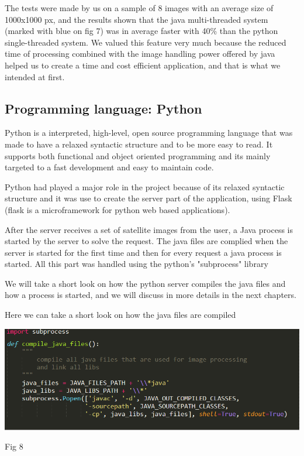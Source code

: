 \documentclass[12pt, a4paper]{report}
\begin{document}
\quad
The tests were made by us on a sample of 8 images with an average size of 1000x1000 px, and the results shown that the java multi-threaded system (marked with blue on fig 7) was in average faster with 40\% than the python single-threaded system. We valued this feature very much because the reduced time of processing combined with the image handling power offered by java helped us to create a time and cost efficient application, and that is what we intended at first.


\subsection{Programming language: Python}
\medskip

\quad
Python is a interpreted, high-level, open source programming language that was made to have a  relaxed syntactic structure and to be more easy to read. It supports both functional and object oriented programming and its mainly targeted to a fast development and easy to maintain code.
\par

Python had played a major role in the project because of its relaxed syntactic structure and it was use to create the server part of the application, using Flask (flask is a microframework for python web based applications).
\par 

After the server receives a set of satellite images from the user, a Java process is started by the server to solve the request. The java files are complied when the server is started for the first time and then for every request a java process is started. All this part was handled using the python's "subprocess" library
\par
\medskip

We will take a short look on how the python server compiles the java files and how a process is started, and we will discuss in more details in the next chapters.
\medskip

Here we can take a short look on how the java files are compiled
\par
\bigskip
\includegraphics[scale=0.8, center]{python_call_java_1.png}
\begin{center}
Fig 8
\end{center}
\end{document}
